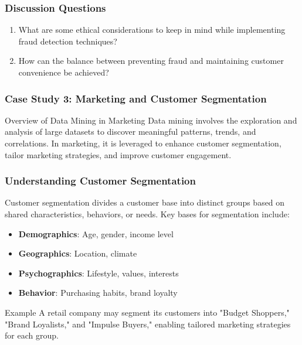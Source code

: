\documentclass[aspectratio=169]{beamer}
\begin{document}
\begin{frame}[fragile]
    \frametitle{Discussion Questions}
    \begin{enumerate}
        \item What are some ethical considerations to keep in mind while implementing fraud detection techniques?
        \item How can the balance between preventing fraud and maintaining customer convenience be achieved?
    \end{enumerate}
\end{frame}

\begin{frame}[fragile]
    \frametitle{Case Study 3: Marketing and Customer Segmentation}
    \begin{block}{Overview of Data Mining in Marketing}
        Data mining involves the exploration and analysis of large datasets to discover meaningful patterns, trends, and correlations. In marketing, it is leveraged to enhance customer segmentation, tailor marketing strategies, and improve customer engagement.
    \end{block}
\end{frame}

\begin{frame}[fragile]
    \frametitle{Understanding Customer Segmentation}
    Customer segmentation divides a customer base into distinct groups based on shared characteristics, behaviors, or needs. Key bases for segmentation include:
    \begin{itemize}
        \item \textbf{Demographics}: Age, gender, income level
        \item \textbf{Geographics}: Location, climate
        \item \textbf{Psychographics}: Lifestyle, values, interests
        \item \textbf{Behavior}: Purchasing habits, brand loyalty
    \end{itemize}
    \begin{block}{Example}
        A retail company may segment its customers into "Budget Shoppers," "Brand Loyalists," and "Impulse Buyers," enabling tailored marketing strategies for each group.
    \end{block}
\end{frame}
\end{document}
